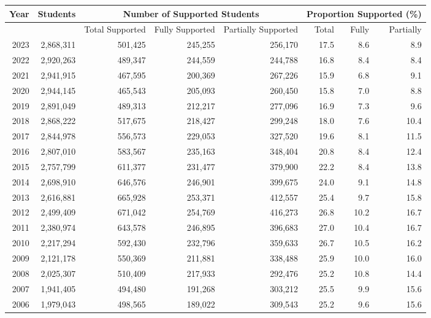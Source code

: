 \begin{landscape}
\setlength{\tabcolsep}{4pt} %
\renewcommand{\arraystretch}{0.95} %
\begin{table}
\centering
\begin{tabular}{rrrrrrrr}
\toprule
Year & Students & \multicolumn{3}{|c|}{Number of Supported Students} & \multicolumn{3}{c}{Proportion Supported (\%)} \\
\midrule
 & & Total Supported & Fully Supported & Partially Supported & Total & Fully & Partially \\
\midrule
2023 & 2,868,311 & 501,425 & 245,255 & 256,170 & 17.5 & 8.6 & 8.9 \\
2022 & 2,920,263 & 489,347 & 244,559 & 244,788 & 16.8 & 8.4 & 8.4 \\
2021 & 2,941,915 & 467,595 & 200,369 & 267,226 & 15.9 & 6.8 & 9.1 \\
2020 & 2,944,145 & 465,543 & 205,093 & 260,450 & 15.8 & 7.0 & 8.8 \\
2019 & 2,891,049 & 489,313 & 212,217 & 277,096 & 16.9 & 7.3 & 9.6 \\
2018 & 2,868,222 & 517,675 & 218,427 & 299,248 & 18.0 & 7.6 & 10.4 \\
2017 & 2,844,978 & 556,573 & 229,053 & 327,520 & 19.6 & 8.1 & 11.5 \\
2016 & 2,807,010 & 583,567 & 235,163 & 348,404 & 20.8 & 8.4 & 12.4 \\
2015 & 2,757,799 & 611,377 & 231,477 & 379,900 & 22.2 & 8.4 & 13.8 \\
2014 & 2,698,910 & 646,576 & 246,901 & 399,675 & 24.0 & 9.1 & 14.8 \\
2013 & 2,616,881 & 665,928 & 253,371 & 412,557 & 25.4 & 9.7 & 15.8 \\
2012 & 2,499,409 & 671,042 & 254,769 & 416,273 & 26.8 & 10.2 & 16.7 \\
2011 & 2,380,974 & 643,578 & 246,895 & 396,683 & 27.0 & 10.4 & 16.7 \\
2010 & 2,217,294 & 592,430 & 232,796 & 359,633 & 26.7 & 10.5 & 16.2 \\
2009 & 2,121,178 & 550,369 & 211,881 & 338,488 & 25.9 & 10.0 & 16.0 \\
2008 & 2,025,307 & 510,409 & 217,933 & 292,476 & 25.2 & 10.8 & 14.4 \\
2007 & 1,941,405 & 494,480 & 191,268 & 303,212 & 25.5 & 9.9 & 15.6 \\
2006 & 1,979,043 & 498,565 & 189,022 & 309,543 & 25.2 & 9.6 & 15.6 \\

\end{tabular}
\end{table}
\end{landscape}
